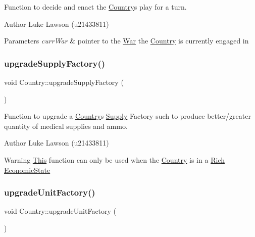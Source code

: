 Function to decide and enact the \mbox{\hyperlink{class_country}{Country}}\textquotesingle{}s play for a turn. 

\begin{DoxyAuthor}{Author}
Luke Lawson (u21433811) 
\end{DoxyAuthor}

\begin{DoxyParams}{Parameters}
{\em curr\+War} & pointer to the \mbox{\hyperlink{class_war}{War}} the \mbox{\hyperlink{class_country}{Country}} is currently engaged in \\
\hline
\end{DoxyParams}
\mbox{\label{class_country_ac2dbba23738d7aa781066d12d8b60db1}} 
\subsubsection{\texorpdfstring{upgradeSupplyFactory()}{upgradeSupplyFactory()}}
{\footnotesize\ttfamily void Country\+::upgrade\+Supply\+Factory (\begin{DoxyParamCaption}{ }\end{DoxyParamCaption})}



Function to upgrade a \mbox{\hyperlink{class_country}{Country}}\textquotesingle{}s \mbox{\hyperlink{class_supply}{Supply}} Factory such to produce better/greater quantity of medical supplies and ammo. 

\begin{DoxyAuthor}{Author}
Luke Lawson (u21433811) 
\end{DoxyAuthor}
\begin{DoxyWarning}{Warning}
\mbox{\hyperlink{class_this}{This}} function can only be used when the \mbox{\hyperlink{class_country}{Country}} is in a \mbox{\hyperlink{class_rich}{Rich}} \mbox{\hyperlink{class_economic_state}{Economic\+State}} 
\end{DoxyWarning}
\mbox{\label{class_country_ae1250eaf85c6269b64ceb857bff5cea6}} 
\subsubsection{\texorpdfstring{upgradeUnitFactory()}{upgradeUnitFactory()}}
{\footnotesize\ttfamily void Country\+::upgrade\+Unit\+Factory (\begin{DoxyParamCaption}{ }\end{DoxyParamCaption})}



